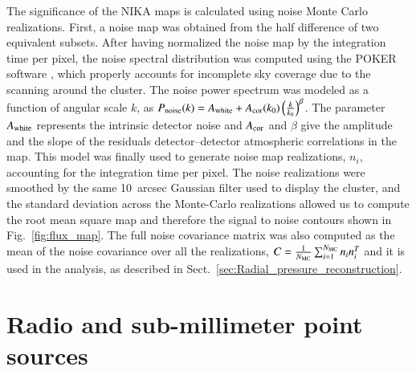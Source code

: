 \documentclass[twocolumn,traditabstract]{aa}
\begin{document}
The significance of the NIKA maps is calculated using noise Monte Carlo realizations. First, a noise map was obtained from the half difference of two equivalent subsets. After having normalized the noise map by the integration time per pixel, the noise spectral distribution was computed using the POKER software \citep{ponthieu2011}, which properly accounts for incomplete sky coverage due to the scanning around the cluster. The noise power spectrum was modeled as a function of angular scale $k$, as $P_{\rm noise}(k) = A_{\rm white} + A_{\rm cor}(k_0) \left(\frac{k}{k_0}\right)^{\beta}$. The parameter $A_{\rm white}$ represents the intrinsic detector noise and $A_{\rm cor}$ and $\beta$ give the amplitude and the slope of the residuals detector--detector atmospheric correlations in the map. This model was finally used to generate noise map realizations, $n_i$, accounting for the integration time per pixel. The noise realizations were smoothed by the same 10~arcsec Gaussian filter used to display the cluster, and the standard deviation across the Monte-Carlo realizations allowed us to compute the root mean square map and therefore the signal to noise contours shown in Fig.~\ref{fig:flux_map}. The full noise covariance matrix was also computed as the mean of the noise covariance over all the realizations, $C = \frac{1}{N_{\rm MC}}\sum_{i=1}^{N_{\rm MC}}n_i n_i^{T}$ and it is used in the analysis, as described in Sect.~\ref{sec:Radial_pressure_reconstruction}.

\section{Radio and sub-millimeter point sources}\label{Radio_and_infrared_point_sources}
\end{document}
